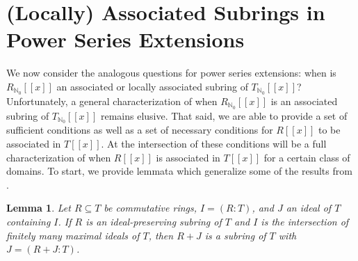 \documentclass[12pt]{amsart}
\newtheorem{lemma}[theorem]{Lemma}
\theoremstyle{definition}
\newcommand{\bNo}{{{\mathbb N}_0}}
\begin{document}
\section{(Locally) Associated Subrings in Power Series Extensions}

We now consider the analogous questions for power series extensions: when is $R_\bNo[[x]]$ an associated or locally associated subring of $T_\bNo[[x]]$? Unfortunately, a general characterization of when $R_\bNo[[x]]$ is an associated subring of $T_\bNo[[x]]$ remains elusive. That said, we are able to provide a set of sufficient conditions as well as a set of necessary conditions for $R[[x]]$ to be associated in $T[[x]]$. At the intersection of these conditions will be a full characterization of when $R[[x]]$ is associated in $T[[x]]$ for a certain class of domains. To start, we provide lemmata which generalize some of the results from \cite[Section 4]{subringrelations}.

\begin{lemma}
    \label{conductor of R+J}
    Let $R\subseteq T$ be commutative rings, $I=(R:T)$, and $J$ an ideal of $T$ containing $I$. If $R$ is an ideal-preserving subring of $T$ and $I$ is the intersection of finitely many maximal ideals of $T$, then $R+J$ is a subring of $T$ with $J=(R+J:T)$.
\end{lemma}
\end{document}
